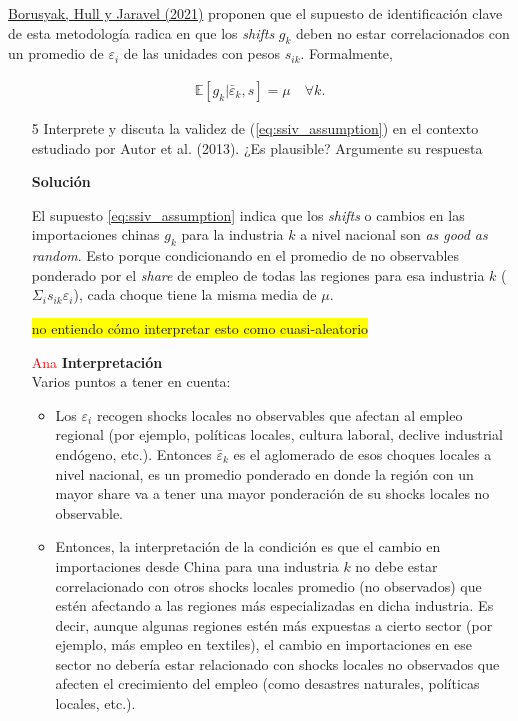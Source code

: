 \documentclass[a4paper, answers, addpoints, 11pt]{exam}
\newenvironment{solucion}{%
  \begin{mdframed}[
    backgroundcolor=blue!5,    %
    linecolor=blue!50,          %
    linewidth=2pt,              %
    leftmargin=10pt,            %
    rightmargin=8pt,           %
    topline=true,              %
    bottomline=true,            %
    roundcorner=10pt,           %
    innerleftmargin=10pt,       %
    innerrightmargin=10pt,      %
    innerbottommargin=10pt,     %
    innertopmargin=10pt         %
  ]%
  \begin{tcolorbox}[colframe=blue!50!black, colback=blue!50, coltitle=white, sharp corners=all, boxrule=1mm, width=\textwidth, halign=left, valign=center, top=0mm, bottom=0mm, left=0mm, right=0mm] \textbf{Solución} \end{tcolorbox} }{\end{mdframed}}
\begin{document}
\href{https://academic.oup.com/restud/article-abstract/89/1/181/6294942?redirectedFrom=fulltext}{Borusyak, Hull y Jaravel (2021)} proponen que el supuesto de identificación clave de esta metodología radica en que los \textit{shifts} $g_k$ deben no estar correlacionados con un promedio de $\varepsilon_i$ de las unidades con pesos $s_{ik}$. Formalmente,

\begin{align}
     \mathbb{E}[g_k | \bar{\varepsilon}_k, s] = \mu \quad \forall k.
     \label{eq:ssiv_assumption}
\end{align}

\begin{enumerate}
    \item[5] Interprete y discuta la validez de (\ref{eq:ssiv_assumption}) en el contexto estudiado por Autor et al. (2013). ¿Es plausible? Argumente su respuesta


    
    \begin{solucion}

    El supuesto \ref{eq:ssiv_assumption} indica que los \textit{shifts} o cambios en las importaciones chinas $g_k$ para la industria $k$ a nivel nacional son \textit{as good as random}. Esto porque condicionando en el promedio de no observables ponderado por el \textit{share} de empleo de todas las regiones para esa industria $k$ ($\Sigma_is_{ik}\varepsilon_i$), cada choque tiene la misma media de $\mu$. 
 
    \colorbox{yellow}{no entiendo cómo interpretar esto como cuasi-aleatorio}


     \textcolor{red}{Ana}
    \textbf{Interpretación} \\
        Varios puntos a tener en cuenta:
     \begin{itemize}
     \item  Los $\varepsilon_i$  recogen shocks locales no observables que afectan al empleo regional (por ejemplo, políticas locales, cultura laboral, declive industrial endógeno, etc.). Entonces $\bar{\varepsilon}_k$ es el aglomerado de esos choques locales a nivel nacional,  es un promedio ponderado en donde la región con un mayor share va a tener una mayor ponderación de su shocks locales no observable.
    \item  Entonces, la interpretación de la condición es que el cambio en importaciones desde China para una industria $k$ no debe estar correlacionado con otros shocks locales promedio (no observados) que estén afectando a las regiones más especializadas en dicha industria.  Es decir,   aunque algunas regiones estén más expuestas a cierto sector (por ejemplo, más empleo en textiles), el cambio en importaciones en ese sector no debería estar relacionado con shocks locales no observados que afecten el crecimiento del empleo (como desastres naturales, políticas locales, etc.). 
    

\end{itemize}
\end{solucion}
\end{enumerate}
\end{document}
